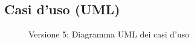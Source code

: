 \subsection{Casi d'uso (UML)}
\vspace{0.5cm}
\begin{figure}[H]
    \centering
    \caption{Versione 5: Diagramma UML dei casi d'uso}
    \label{fig:use_case_uml_v5}
\end{figure}
